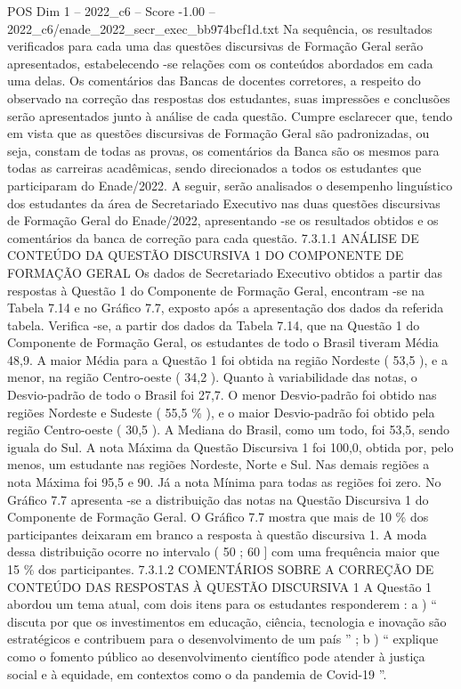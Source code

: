 \begin{textsample}{POS Dim 1 – 2022\_c6 – Score -1.00 – 2022\_c6/enade\_2022\_secr\_exec\_bb974bcf1d.txt}
Na sequência, os resultados verificados para cada uma das questões discursivas de Formação Geral serão apresentados, estabelecendo -se relações com os conteúdos abordados em cada uma delas.
Os comentários das Bancas de docentes corretores, a respeito do observado na correção das respostas dos estudantes, suas impressões e conclusões serão apresentados junto à análise de cada questão.
Cumpre esclarecer que, tendo em vista que as questões discursivas de Formação Geral são padronizadas, ou seja, constam de todas as provas, os comentários da Banca são os mesmos para todas as carreiras acadêmicas, sendo direcionados a todos os estudantes que participaram do Enade/2022.
A seguir, serão analisados o desempenho linguístico dos estudantes da área de Secretariado Executivo nas duas questões discursivas de Formação Geral do Enade/2022, apresentando -se os resultados obtidos e os comentários da banca de correção para cada questão. 7.3.1.1 ANÁLISE DE CONTEÚDO DA QUESTÃO DISCURSIVA 1 DO COMPONENTE DE FORMAÇÃO GERAL Os dados de Secretariado Executivo obtidos a partir das respostas à Questão 1 do Componente de Formação Geral, encontram -se na Tabela 7.14 e no Gráfico 7.7, exposto após a apresentação dos dados da referida tabela.
Verifica -se, a partir dos dados da Tabela 7.14, que na Questão 1 do Componente de Formação Geral, os estudantes de todo o Brasil tiveram Média 48,9.
A maior Média para a Questão 1 foi obtida na região Nordeste ( 53,5 ), e a menor, na região Centro-oeste ( 34,2 ).
Quanto à variabilidade das notas, o Desvio-padrão de todo o Brasil foi 27,7.
O menor Desvio-padrão foi obtido nas regiões Nordeste e Sudeste ( 55,5 \% ), e o maior Desvio-padrão foi obtido pela região Centro-oeste ( 30,5 ).
A Mediana do Brasil, como um todo, foi 53,5, sendo iguala do Sul.
A nota Máxima da Questão Discursiva 1 foi 100,0, obtida por, pelo menos, um estudante nas regiões Nordeste, Norte e Sul.
Nas demais regiões a nota Máxima foi 95,5 e 90.
Já a nota Mínima para todas as regiões foi zero.
No Gráfico 7.7 apresenta -se a distribuição das notas na Questão Discursiva 1 do Componente de Formação Geral.
O Gráfico 7.7 mostra que mais de 10 \% dos participantes deixaram em branco a resposta à questão discursiva 1.
A moda dessa distribuição ocorre no intervalo ( 50 ; 60 ] com uma frequência maior que 15 \% dos participantes. 7.3.1.2 COMENTÁRIOS SOBRE A CORREÇÃO DE CONTEÚDO DAS RESPOSTAS À QUESTÃO DISCURSIVA 1 A Questão 1 abordou um tema atual, com dois itens para os estudantes responderem : a ) “ discuta por que os investimentos em educação, ciência, tecnologia e inovação são estratégicos e contribuem para o desenvolvimento de um país ” ; b ) “ explique como o fomento público ao desenvolvimento científico pode atender à justiça social e à equidade, em contextos como o da pandemia de Covid-19 ”.

\end{textsample}
